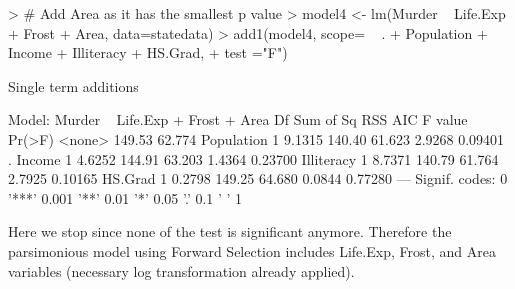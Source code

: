\documentclass{article}
\begin{document}
\begin{Schunk}
\begin{Sinput}
> # Add Area as it has the smallest p value
> model4 <- lm(Murder ~ Life.Exp + Frost + Area, data=statedata)
> add1(model4, scope= ~ . + Population + Income + Illiteracy + HS.Grad,
+      test ="F")
\end{Sinput}
\begin{Soutput}
Single term additions

Model:
Murder ~ Life.Exp + Frost + Area
           Df Sum of Sq    RSS    AIC F value  Pr(>F)  
<none>                  149.53 62.774                  
Population  1    9.1315 140.40 61.623  2.9268 0.09401 .
Income      1    4.6252 144.91 63.203  1.4364 0.23700  
Illiteracy  1    8.7371 140.79 61.764  2.7925 0.10165  
HS.Grad     1    0.2798 149.25 64.680  0.0844 0.77280  
---
Signif. codes:  0 '***' 0.001 '**' 0.01 '*' 0.05 '.' 0.1 ' ' 1
\end{Soutput}
\end{Schunk}

\noindent Here we stop since none of the test is significant anymore. Therefore the parsimonious model using Forward Selection includes Life.Exp, Frost, and Area variables (necessary log transformation already applied).
\end{document}
